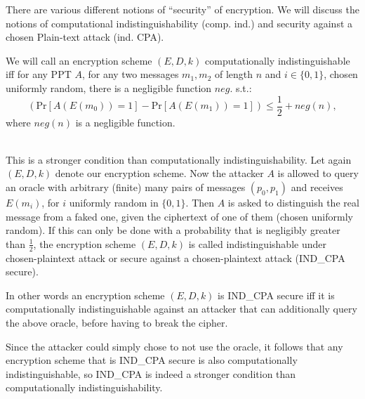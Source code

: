 There are various different notions of ``security'' of encryption. We will discuss the notions of %
computational indistinguishability (comp. ind.) and security against a chosen Plain-text attack (ind. CPA). 
\begin{definition}
  We will call an encryption scheme $(E,D,k)$ computationally indistinguishable iff for any PPT $A$, for any two messages $m_1, m_2$ of length $n$ and $i\in \{0,1\}$, chosen uniformly random, there is a negligible function $neg.$ s.t.:
  \[(\mathrm{Pr}\left[A(E(m_0))=1\right]-\mathrm{Pr}\left[A(E(m_1))=1\right])\leq \frac{1}{2}+neg(n), \] where $neg(n)$ is a negligible function.
\end{definition}
\begin{definition}\ \\
  This is a stronger condition than computationally indistinguishability. 
  Let again $(E, D, k)$ denote our encryption scheme. 
  Now the attacker $A$ is allowed to query an oracle with arbitrary (finite) many pairs of messages $(p_0, p_1)$ and receives $E(m_i)$, for $i$ uniformly random in $\{0,1\}$. Then $A$ is asked to distinguish the real message from a faked one, given the ciphertext of one of them (chosen uniformly random). If this can only be done with a probability that is negligibly greater than $\frac{1}{2}$, the encryption scheme $(E, D, k)$ is called indistinguishable under chosen-plaintext attack or secure against a chosen-plaintext attack (IND\_CPA secure). 
  
  In other words an encryption scheme $(E, D, k)$ is IND\_CPA secure iff it is computationally indistinguishable against an attacker that can additionally query the above oracle, before having to break the cipher. 
  
  Since the attacker could simply chose to not use the oracle, it follows that any encryption scheme that is IND\_CPA secure is also computationally indistinguishable, so IND\_CPA is indeed a stronger condition than computationally indistinguishability. 
\end{definition}

